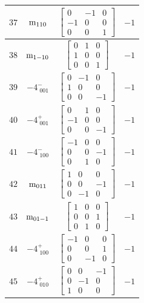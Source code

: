\documentclass[fleqn,8pt]{jsarticle}
\begin{document}
\begin{longtable}{cccc}
$ 37 $ & $ {\rm m}_{110} $ & $ \begin{bmatrix} 0 & -1 & 0 \\ -1 & 0 & 0 \\ 0 & 0 & 1 \end{bmatrix} $ & $ -1 $ \\ \hline
$ 38 $ & $ {\rm m}_{1-10} $ & $ \begin{bmatrix} 0 & 1 & 0 \\ 1 & 0 & 0 \\ 0 & 0 & 1 \end{bmatrix} $ & $ -1 $ \\ \hline
$ 39 $ & $ -4^{-}_{\,\,001} $ & $ \begin{bmatrix} 0 & -1 & 0 \\ 1 & 0 & 0 \\ 0 & 0 & -1 \end{bmatrix} $ & $ -1 $ \\ \hline
$ 40 $ & $ -4^{+}_{\,\,001} $ & $ \begin{bmatrix} 0 & 1 & 0 \\ -1 & 0 & 0 \\ 0 & 0 & -1 \end{bmatrix} $ & $ -1 $ \\ \hline
$ 41 $ & $ -4^{-}_{\,\,100} $ & $ \begin{bmatrix} -1 & 0 & 0 \\ 0 & 0 & -1 \\ 0 & 1 & 0 \end{bmatrix} $ & $ -1 $ \\ \hline
$ 42 $ & $ {\rm m}_{011} $ & $ \begin{bmatrix} 1 & 0 & 0 \\ 0 & 0 & -1 \\ 0 & -1 & 0 \end{bmatrix} $ & $ -1 $ \\ \hline
$ 43 $ & $ {\rm m}_{01-1} $ & $ \begin{bmatrix} 1 & 0 & 0 \\ 0 & 0 & 1 \\ 0 & 1 & 0 \end{bmatrix} $ & $ -1 $ \\ \hline
$ 44 $ & $ -4^{+}_{\,\,100} $ & $ \begin{bmatrix} -1 & 0 & 0 \\ 0 & 0 & 1 \\ 0 & -1 & 0 \end{bmatrix} $ & $ -1 $ \\ \hline
$ 45 $ & $ -4^{+}_{\,\,010} $ & $ \begin{bmatrix} 0 & 0 & -1 \\ 0 & -1 & 0 \\ 1 & 0 & 0 \end{bmatrix} $ & $ -1 $ \\ \hline

\end{longtable}
\end{document}

